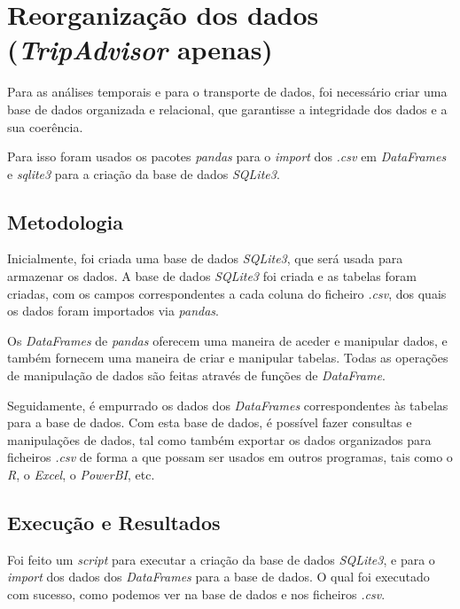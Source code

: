 \chapter{Reorganização dos dados (\textit{TripAdvisor} apenas)}
\label{cap8}


Para as análises temporais e para o transporte de dados, foi necessário criar uma base de dados organizada e relacional, que garantisse a integridade dos dados e a sua coerência.

Para isso foram usados os pacotes \textit{pandas} para o \textit{import} dos \textit{.csv} em \textit{DataFrames} e \textit{sqlite3} para a criação da base de dados \textit{SQLite3}.

\section{Metodologia}

Inicialmente, foi criada uma base de dados \textit{SQLite3}, que será usada para armazenar os dados. A base de dados \textit{SQLite3} foi criada e as tabelas foram criadas, com os campos correspondentes a cada coluna do ficheiro \textit{.csv}, dos quais os dados foram importados via \textit{pandas}. 

Os \textit{DataFrames} de \textit{pandas} oferecem uma maneira de aceder e manipular dados, e também fornecem uma maneira de criar e manipular tabelas. Todas as operações de manipulação de dados são feitas através de funções de \textit{DataFrame}.

Seguidamente, é empurrado os dados dos \textit{DataFrames} correspondentes às tabelas para a base de dados. Com esta base de dados, é possível fazer consultas e manipulações de dados, tal como também exportar os dados organizados para ficheiros \textit{.csv} de forma a que possam ser usados em outros programas, tais como o \textit{R}, o \textit{Excel}, o \textit{PowerBI}, etc.

\section{Execução e Resultados}

Foi feito um \textit{script} para executar a criação da base de dados \textit{SQLite3}, e para o \textit{import} dos dados dos \textit{DataFrames} para a base de dados. O qual foi executado com sucesso, como podemos ver na base de dados e nos ficheiros \textit{.csv}.